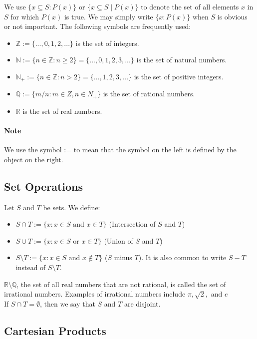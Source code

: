 \documentclass[12pt]{article}
\begin{document}
\noindent
We use $\{x \subseteq S : P(x)\} \textrm{ or } \{x \subseteq S \mid P(x)\} $ to denote the set of all elements $x$ in $S$ for which $P(x)$ is true. 
We may simply write $\{x : P(x)\} $ when $S$ is obvious or not important.
The following symbols are frequently used:
\begin{itemize}
    \item $ \mathbb{Z} := \{..., 0, 1, 2, ...\} $ is the set of integers.
    \item $ \mathbb{N} := \{n \in \mathbb{Z} : n \geq 2\} = \{..., 0, 1, 2, 3, ...\}$ is the set of natural numbers.
    \item $ \mathbb{N_+} := \{n \in \mathbb{Z} : n > 2\} = \{..., 1, 2, 3, ...\}$ is the set of positive integers.
    \item $ \mathbb{Q} := \{m/n : m \in Z, n \in N_+\} $ is the set of rational numbers.
    \item $ \mathbb{R} $ is the set of real numbers.
\end{itemize}

\paragraph{Note} We use the symbol := to mean that the symbol on the left is defined by the object on the right.

\subsection{Set Operations}
\noindent 
Let $S$ and $T$ be sets. We define:
\begin{itemize}
    \item $S \cap T := \{x : x \in S \textrm{ and } x \in T \} $ (Intersection of $S$ and $T$)
    \item $S \cup T := \{x : x \in S \textrm{ or } x \in T \} $ (Union of $S$ and $T$)
    \item $S \setminus T := \{x : x \in S \textrm{ and } x \notin T \} $ ($S$ minus $T$). It is also common to write $S - T$ instead of $S \setminus T$.
\end{itemize}
\noindent
$ \mathbb{R} \setminus \mathbb{Q} $, the set of all real numbers that are not rational, is
called the set of irrational numbers. Examples of irrational numbers include $\pi, \sqrt{2}, \textrm{ and } e $ \\
If $ S \cap T = \emptyset $, then we say that $S$ and $T$ are disjoint.

\subsection{Cartesian Products}
\end{document}
